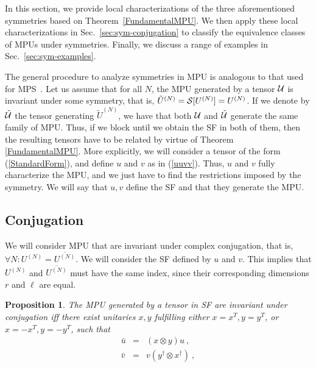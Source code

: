 \documentclass[pra,twocolumn,nofootinbib,superscriptaddress]{revtex4-1}
\newcommand{\bea}{\begin{eqnarray}}
\newcommand{\eea}{\end{eqnarray}}
\newtheorem{prop}[thm]{Proposition}
\begin{document}
In this section, we provide local characterizations of the three
aforementioned symmetries based on Theorem~\ref{FundamentalMPU}. We then
apply these local characterizations in Sec.~\ref{sec:sym-conjugation} to
classify the equivalence classes of MPUs under symmetries.  Finally, we
discuss a range of examples in Sec.~\ref{sec:sym-examples}.




The general procedure to analyze symmetries in MPU is analogous to that
used for MPS~\cite{sanz:mps-syms}. Let us assume that for all $N$, the MPU
generated by a tensor ${\cal U}$ is invariant under some symmetry, that
is, $\tilde U^{(N)}={\cal S}[U^{(N)}]=U^{(N)}$. If we denote by $\tilde
	{\cal U}$ the tensor generating $\tilde U^{(N)}$, we have that both ${\cal
			U}$ and $\tilde{\cal U}$ generate the same family of MPU. Thus, if we
block until we obtain the SF in both of them, then the resulting tensors
have to be related by virtue of Theorem \ref{FundamentalMPU}. More explicitly, we
will consider a tensor of the form (\ref{StandardForm}), and define $u$
and $v$ as in (\ref{uuvv}).  Thus, $u$ and $v$
fully characterize the MPU, and we just have to find the restrictions
imposed by the symmetry. We will say that $u,v$ define the SF and that
they generate
the MPU.




\subsection{Conjugation}

We will consider MPU that are invariant under complex conjugation, that
is, $\forall N: U^{(N)}=\overline{U^{(N)}}$. We will consider the SF
defined by $u$ and $v$. This implies that $U^{(N)}$ and
$\overline{U^{(N)}}$ must have the same index, since their corresponding
dimensions $r$ and $\ell$ are equal.

\begin{prop}
	\label{prop1conj}
	The MPU generated by a tensor in SF are invariant under conjugation iff
	there exist unitaries $x,y$ fulfilling either $x=x^T,y=y^T$, or $x=-x^T,y=-y^T$, such that
	\begin{subequations}
		\label{conjugation}
		\bea
		\label{uconjugation}
		\bar u&=&(x\otimes y) u\ ,\\
		\label{vconjugation}
		\bar v&=& v (y^\dagger\otimes x^\dagger) \ ,
		\eea
	\end{subequations}
\end{prop}
\end{document}
